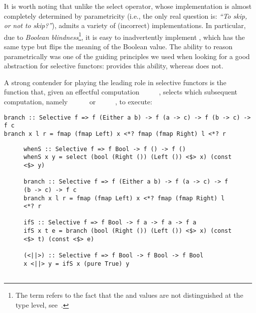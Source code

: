 {It is worth noting that unlike the select operator, whose implementation is
almost completely determined by parametricity (i.e., the only real question is:
\emph{``To skip, or not to skip?''}),  admits a variety of (incorrect)
implementations. In particular, due to \emph{Boolean blindness}\footnote{The
term refers to the fact that the  and  values are not
distinguished at the type level, see~\citet{boolean-blindness}.},
it is easy to inadvertently implement , which has the same type but
flips the meaning of the Boolean value. The ability to reason parametrically was
one of the guiding principles we used when looking for a good abstraction for
selective functors:  provides this ability, whereas  does
not.


A strong contender for playing the leading role in selective functors is the
function  that, given an effectful computation
~\hs{::}~~~~, selects which subsequent
computation, namely ~\hs{::}~~\hs{(}~\hs{->}~ or
~\hs{::}~~\hs{(}~\hs{->}~, to execute:

\vspace{1mm}
\begin{verbatim}
branch :: Selective f => f (Either a b) -> f (a -> c) -> f (b -> c) -> f c
branch x l r = fmap (fmap Left) x <*? fmap (fmap Right) l <*? r
\end{verbatim}
\vspace{1mm}

\begin{figure}
\begin{verbatim}
whenS :: Selective f => f Bool -> f () -> f ()
whenS x y = select (bool (Right ()) (Left ()) <$> x) (const <$> y)

branch :: Selective f => f (Either a b) -> f (a -> c) -> f (b -> c) -> f c
branch x l r = fmap (fmap Left) x <*? fmap (fmap Right) l <*? r

ifS :: Selective f => f Bool -> f a -> f a -> f a
ifS x t e = branch (bool (Right ()) (Left ()) <$> x) (const <$> t) (const <$> e)

(<||>) :: Selective f => f Bool -> f Bool -> f Bool
x <||> y = ifS x (pure True) y


\end{verbatim}
\end{figure}}

